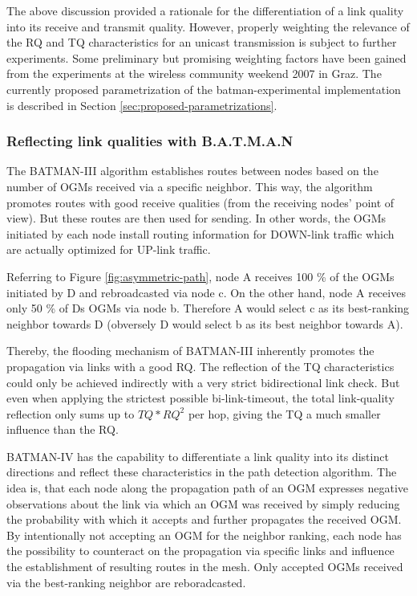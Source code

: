 \documentclass[11pt]{article}
\begin{document}
The above discussion provided a rationale for the differentiation of a link quality into its receive and transmit quality.
%
However, properly weighting the relevance of the RQ and TQ characteristics for an unicast transmission is subject to further experiments. %
Some preliminary but promising weighting factors have been gained from the experiments at the wireless community weekend 2007 in Graz.
%
The currently proposed parametrization of the batman-experimental implementation is described in Section \ref{sec:proposed-parametrizations}.


%
\subsubsection{Reflecting link qualities with B.A.T.M.A.N}
\label{sec:batman-link-reflection}

The BATMAN-III algorithm establishes routes between nodes based on the number of OGMs  received via a specific neighbor.
%
This way, the algorithm promotes routes with good receive qualities (from the receiving nodes' point of view). But these routes are then used for sending.
%
In other words, the OGMs initiated by each node install routing information for DOWN-link traffic which are actually optimized for UP-link traffic.

Referring to Figure \ref{fig:asymmetric-path}, node A receives 100 \% of the OGMs initiated by D and rebroadcasted via node c.
%
On the other hand, node A receives only 50 \% of Ds OGMs via node b.
%
Therefore A would select c as its best-ranking neighbor towards D (obversely D would select b as its best neighbor towards A).

Thereby, the flooding mechanism of BATMAN-III inherently promotes the propagation via links with a good RQ. The reflection of the TQ characteristics could only be achieved indirectly with a very strict bidirectional link check.
%
But even when applying the strictest possible bi-link-timeout, the total link-quality reflection only sums up to $ TQ * RQ^2 $ per hop, giving the TQ a much smaller influence than the RQ.

BATMAN-IV has the capability to differentiate a link quality into its distinct directions and reflect these characteristics in the path detection algorithm.
%
The idea is, that each node along the propagation path of an OGM expresses negative observations about the link via which an OGM was received by simply reducing the probability with which it accepts and further propagates the received OGM.
%
By intentionally not accepting an OGM for the neighbor ranking, each node has the possibility to counteract on the propagation via specific links and influence the establishment of resulting routes in the mesh.
Only accepted OGMs received via the best-ranking neighbor are reboradcasted.
\end{document}
